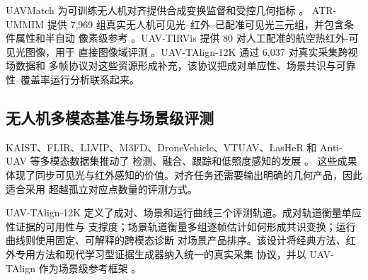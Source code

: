 UAVMatch 为可训练无人机对齐提供合成变换监督和受控几何指标 \cite{gao2025uavmatch}。
ATR-UMMIM 提供 7,969 组真实无人机可见光--红外--已配准可见光三元组，并包含条件属性和半自动
像素级参考 \cite{bin2025atrummim}。UAV-TIRVis 提供 80 对人工配准的航空热红外-可见光图像，用于
直接图像域评测 \cite{vasile2025uavtirvis}。UAV-TAlign-12K 通过 6,037 对真实采集跨视场数据和
多帧协议对这些资源形成补充，该协议把成对单应性、场景共识与可靠性--覆盖率运行分析联系起来。

\subsection{无人机多模态基准与场景级评测}

KAIST、FLIR、LLVIP、M3FD、DroneVehicle、VTUAV、LasHeR 和 Anti-UAV 等多模态数据集推动了
检测、融合、跟踪和低照度感知的发展
\cite{hwang2015kaist,flir2018thermal,jia2021llvip,liu2022tardal,sun2022dronevehicle,zhang2022vtuav,li2022lasher,jiang2023antiuav}。
这些成果体现了同步可见光与红外感知的价值。对齐任务还需要输出明确的几何产品，因此适合采用
超越孤立对应点数量的评测方式。

UAV-TAlign-12K 定义了成对、场景和运行曲线三个评测轨道。成对轨道衡量单应性证据的可用性与
支撑度；场景轨道衡量多组逐帧估计如何形成共识变换；运行曲线则使用固定、可解释的跨模态诊断
对场景产品排序。该设计将经典方法、红外专用方法和现代学习型证据生成器纳入统一的真实采集
协议，并以 UAV-TAlign 作为场景级参考框架 \cite{ma2021survey,liao2024survey}。
